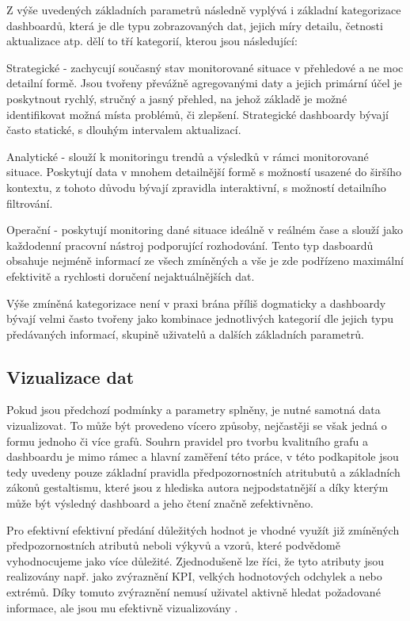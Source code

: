 \documentclass[
  digital,     %
  twoside,     %
  lof,         %
  lot,         %
]{fithesis4}
\begin{document}
Z výše uvedených základních parametrů následně vyplývá i základní kategorizace dashboardů, která je dle typu zobrazovaných dat, jejich míry detailu, četnosti aktualizace atp. dělí to tří kategorií, kterou jsou následující\parencite[s.~3]{Faron2016thesis}:
\begin{compactitem}
    \item Strategické - zachycují současný stav monitorované situace v přehledové a ne moc detailní formě. Jsou tvořeny převážně agregovanými daty a jejich primární účel je poskytnout rychlý, stručný a jasný přehled, na jehož základě je možné identifikovat možná místa problémů, či zlepšení. Strategické dashboardy bývají často statické, s dlouhým intervalem aktualizací.
    \item Analytické - slouží k monitoringu trendů a výsledků v rámci monitorované situace. Poskytují data v mnohem detailnější formě s možností usazené do širšího kontextu, z tohoto důvodu bývají zpravidla interaktivní, s možností detailního filtrování.
    \item Operační - poskytují monitoring dané situace ideálně v reálném čase a slouží jako každodenní pracovní nástroj podporující rozhodování. Tento typ dasboardů obsahuje nejméně informací ze všech zmíněných a vše je zde podřízeno maximální efektivitě a rychlosti doručení nejaktuálnějších dat.  
\end{compactitem}

Výše zmíněná kategorizace není v praxi brána příliš dogmaticky a dashboardy bývají velmi často tvořeny jako kombinace jednotlivých kategorií dle jejich typu předávaných informací, skupině uživatelů a dalších základních parametrů.

\subsection{Vizualizace dat}
Pokud jsou předchozí podmínky a parametry splněny, je nutné samotná data vizualizovat. To může být provedeno vícero způsoby, nejčastěji se však jedná o formu jednoho či více grafů. Souhrn pravidel pro tvorbu kvalitního grafu a dashboardu je mimo rámec a hlavní zaměření této práce, v této podkapitole jsou tedy uvedeny pouze základní pravidla předpozornostních atritubutů a základních zákonů gestaltismu, které jsou z hlediska autora nejpodstatnější a díky kterým může být výsledný dashboard a jeho čtení značně zefektivněno. 

Pro efektivní efektivní předání důležitých hodnot je vhodné využít již zmíněných předpozornostních atributů neboli výkyvů a vzorů, které podvědomě vyhodnocujeme jako více důležité. Zjednodušeně lze říci, že tyto atributy jsou realizovány např. jako zvýraznění KPI, velkých hodnotových odchylek a nebo extrémů. Díky tomuto zvýraznění nemusí uživatel aktivně hledat požadované informace, ale jsou mu efektivně vizualizovány \parencite[s.~70]{Marek2015thesis}.
\end{document}
